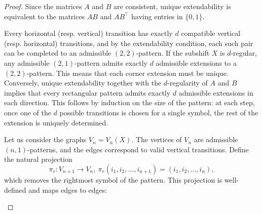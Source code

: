 \documentclass[10pt,a4paper]{amsart}
\begin{document}
\begin{proof}
Since the matrices $A$ and $B$ are consistent, unique extendability is equivalent to the matrices $AB$ and $AB^\top$ having entries in $\{0,1\}$.

Every horizontal (resp. vertical) transition has exactly $d$ compatible vertical (resp. horizontal) transitions, and by the extendability condition, each such pair can be completed to an admissible $(2,2)$-pattern. If the subshift $X$ is $d$-regular, any admissible $(2,1)$-pattern admits exactly $d$ admissible extensions to a $(2,2)$-pattern. This means that each corner extension must be unique.
Conversely, unique extendability together with the $d$-regularity of $A$ and $B$ implies that every rectangular pattern admits exactly $d$ admissible extensions in each direction. This follows by induction on the size of the pattern: at each step, once one of the $d$ possible transitions is chosen for a single symbol, the rest of the extension is uniquely determined.

Let us consider the graphs $V_n=V_n(X)$. The vertices of $V_n$ are admissible $(n,1)$-patterns, and the edges correspond to valid vertical transitions. Define the natural projection
\[
\pi_r: V_{n+1}\rightarrow V_n, \ \pi_r(i_1,i_2,\ldots,i_{n+1})=(i_1,i_2,\ldots,i_{n}),
\]
which removes the rightmost symbol of the pattern. This projection is well-defined and maps edges to edges:
\begin{center}
\end{center}
\end{proof}
\end{document}
